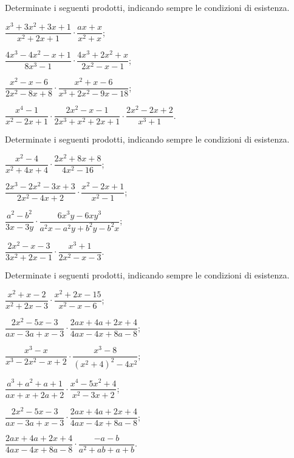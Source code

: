\begin{esercizio}[\Ast]
\label{ese:19.15}
Determinate i seguenti prodotti, indicando sempre le condizioni di esistenza.
\begin{enumeratea}
 \item $\dfrac{x^{3}+3x^{2}+3x+1}{x^{2}+2x+1}\cdot \dfrac{ax+x}{x^{2}+x}$;
 \item $\dfrac{4x^{3}-4x^{2}-x+1}{8x^{3}-1}\cdot\dfrac{4x^{3}+2x^{2}+x}{2x^{2}-x-1}$;
 \item $\dfrac{x^{2}-x-6}{2x^{2}-8x+8}\cdot\dfrac{x^{2}+x-6}{x^{3}+2x^{2}-9x-18}$;
 \item $\dfrac{x^{4}-1}{x^{2}-2x+1}\cdot\dfrac{2x^{2}-x-1}{2x^{3}+x^{2}+2x+1}\cdot\dfrac{2x^{2}-2x+2}{x^{3}+1}$.
\end{enumeratea}
\end{esercizio}

\begin{esercizio}
\label{ese:19.16}
Determinate i seguenti prodotti, indicando sempre le condizioni di esistenza.
\begin{multicols}{2}
\begin{enumeratea}
 \item $\dfrac{x^{2}-4}{x^{2}+4x+4}\cdot \dfrac{2x^{2}+8x+8}{4x^{2}-16}$;
 \item $\dfrac{2x^{3}-2x^{2}-3x+3}{2x^{2}-4x+2}\cdot{\dfrac{x^{2}-2x+1}{x^{2}-1}}$;
 \item $\dfrac{a^{2}-b^{2}}{3x-3y}\cdot {\dfrac{6x^{3}y-6xy^{3}}{a^{2}x-a^{2}y+b^{2}y-b^{2}x}}$;
 \item $\dfrac{2x^{2}-x-3}{3x^{2}+2x-1}\cdot {\dfrac{x^{3}+1}{2x^{2}-x-3}}$.
\end{enumeratea}
\end{multicols}
\end{esercizio}

\begin{esercizio}
\label{ese:19.17}
Determinate i seguenti prodotti, indicando sempre le condizioni di esistenza.
\begin{multicols}{2}
\begin{enumeratea}
 \item $\dfrac{x^{2}+x-2}{x^{2}+2x-3}\cdot {\dfrac{x^{2}+2x-15}{x^{2}-x-6}}$;
 \item $\dfrac{2x^{2}-5x-3}{ax-3a+x-3}\cdot {\dfrac{2ax+4a+2x+4}{4ax-4x+8a-8}}$;
 \item $\dfrac{x^{3}-x}{x^{3}-2x^{2}-x+2}\cdot {\dfrac{x^{3}-8}{\left(x^{2}+4\right)^{2}-4x^{2}}}$;
 \item $\dfrac{a^{3}+a^{2}+a+1}{ax+x+2a+2}\cdot {\dfrac{x^{4}-5x^{2}+4}{x^{2}-3x+2}}$;
 \item $\dfrac{2x^{2}-5x-3}{ax-3a+x-3}\cdot {\dfrac{2ax+4a+2x+4}{4ax-4x+8a-8}}$;
 \item $\dfrac{2ax+4a+2x+4}{4ax-4x+8a-8}\cdot {\dfrac{-a-b}{a^{2}+ab+a+b}}$.
\end{enumeratea}
\end{multicols}
\end{esercizio}

